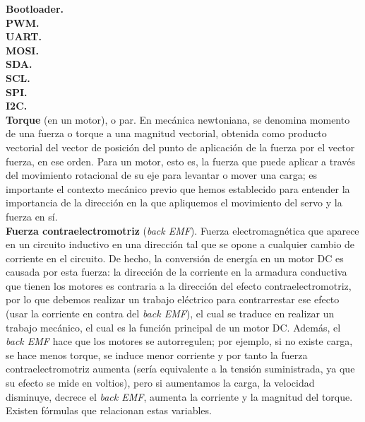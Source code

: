 \documentclass[12pt]{article}
\begin{document}
	\noindent \textbf{\large Bootloader.} \\
	
	\noindent \textbf{\large PWM.} \\
	
	\noindent \textbf{\large UART.} \\
	
	\noindent \textbf{\large MOSI.} \\
	
	\noindent \textbf{\large SDA.} \\
	
	\noindent \textbf{\large SCL.} \\
	
	\noindent \textbf{\large SPI.} \\
	
	\noindent \textbf{\large I2C.} \\
	
	\noindent \textbf{\large Torque} (en un motor), o par. En mecánica newtoniana, se denomina momento de una fuerza o torque a una magnitud vectorial, obtenida como producto vectorial del vector de posición del punto de aplicación de la fuerza por el vector fuerza, en ese orden. Para un motor, esto es, la fuerza que puede aplicar a través del movimiento rotacional de su eje para levantar o mover una carga; es importante el contexto mecánico previo que hemos establecido para entender la importancia de la dirección en la que apliquemos el movimiento del servo y la fuerza en sí.\\
	
	\noindent \textbf{\large Fuerza contraelectromotriz} (\textit{back EMF}). Fuerza electromagnética que aparece en un circuito inductivo en una dirección tal que se opone a cualquier cambio de corriente en el circuito. De hecho, la conversión de energía en un motor DC es causada por esta fuerza: la dirección de la corriente en la armadura conductiva que tienen los motores es contraria a la dirección del efecto contraelectromotriz, por lo que debemos realizar un trabajo eléctrico para contrarrestar ese efecto (usar la corriente en contra del \textit{back EMF}), el cual se traduce en realizar un trabajo mecánico, el cual es la función principal de un motor DC. Además, el \textit{back EMF} hace que los motores se autorregulen; por ejemplo, si no existe carga, se hace menos torque, se induce menor corriente y por tanto la fuerza contraelectromotriz aumenta (sería equivalente a la tensión suministrada, ya que su efecto se mide en voltios), pero si aumentamos la carga, la velocidad disminuye, decrece el \textit{back EMF}, aumenta la corriente y la magnitud del torque. Existen fórmulas que relacionan estas variables.\\
	
\end{document}
